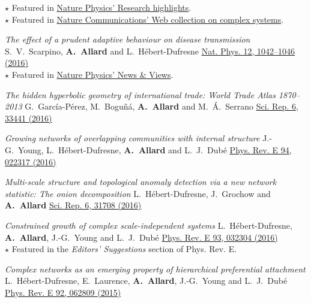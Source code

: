 \documentclass[11pt]{article}
\makeatletter
\newcommand{\reversearabic}[1]{\expandafter\@reversearabic\csname c@#1\endcsname}
\newcommand{\@reversearabic}[1]{%
  \number\numexpr\getrefnumber{this@etaremune@\romannumeral\c@etaremune}-#1+1\relax
}
\newcounter{etaremune}
\newenvironment{etaremune}[1][]{%
  \stepcounter{etaremune}%
  \begin{enumerate}[label=\reversearabic*.,#1]%
}{%
  \edef\@currentlabel{\the\csname c@\@enumctr\endcsname}%
  \label{this@etaremune@\romannumeral\c@etaremune}%
  \end{enumerate}%
}
\makeatother
\begin{document}
\begin{etaremune}[itemsep=0.5em, label={[A\reversearabic*]}]
{  {\footnotesize $\star$ Featured in \href{https://doi.org/10.1038/nphys4046}{Nature Physics' Research highlights}.}\\
  {\footnotesize $\star$ Featured in \href{https://www.nature.com/collections/ycjylwzvmz/}{Nature Communications' Web collection on complex systems}.}}
%
  \item \parbox[t]{\textwidth-30pt}{\textit{The effect of a prudent adaptive behaviour on disease transmission}\split
  S.~V.~Scarpino, \textbf{A.~Allard} and L.~H\'ebert-Dufresne\split
  \href{https://doi.org/10.1038/nphys3832}{Nat. Phys. 12, 1042--1046 (2016)}\\
  {\footnotesize $\star$ Featured in \href{https://doi.org/10.1038/nphys3939}{Nature Physics' News \& Views}.}}%
%
  \item \parbox[t]{\textwidth-30pt}{\textit{The hidden hyperbolic geometry of international trade: World Trade Atlas 1870--2013}\split
  G.~Garc\'ia-P\'erez, M.~Bogu\~n\'a, \textbf{A.~Allard} and M.~\'A.~Serrano\split
  \href{https://doi.org/10.1038/srep33441}{Sci. Rep. 6, 33441 (2016)}}
%
  \item \parbox[t]{\textwidth-30pt}{\textit{Growing networks of overlapping communities with internal structure}\split
  J.-G.~Young, L.~H\'ebert-Dufresne, \textbf{A.~Allard} and L.~J.~Dub\'e\split
  \href{https://doi.org/10.1103/PhysRevE.94.022317}{Phys. Rev. E 94, 022317 (2016)}}
%
  \item \parbox[t]{\textwidth-30pt}{\textit{Multi-scale structure and topological anomaly detection via a new network statistic: The onion decomposition}\split
  L.~H\'ebert-Dufresne, J.~Grochow and \textbf{A.~Allard}\split
  \href{https://doi.org/10.1038/srep31708}{Sci. Rep. 6, 31708 (2016)}}
%
  \item \parbox[t]{\textwidth-30pt}{\textit{Constrained growth of complex scale-independent systems}\split
  L.~H\'ebert-Dufresne, \textbf{A.~Allard}, J.-G.~Young and L.~J.~Dub\'e\split
  \href{https://doi.org/10.1103/PhysRevE.93.032304}{Phys. Rev. E 93, 032304 (2016)}\\
  {\footnotesize $\star$ Featured in the \textit{Editors' Suggestions} section of Phys. Rev. E.}}
%
  \item \parbox[t]{\textwidth-30pt}{\textit{Complex networks as an emerging property of hierarchical preferential attachment}\split
  L.~H\'ebert-Dufresne, E.~Laurence, \textbf{A.~Allard}, J.-G.~Young and L.~J.~Dub\'e\split
  \href{https://doi.org/10.1103/PhysRevE.92.062809}{Phys. Rev. E 92, 062809 (2015)}}

\end{etaremune}
\end{document}

